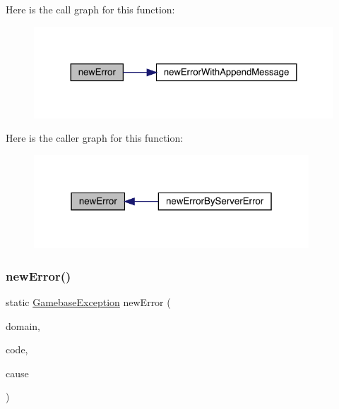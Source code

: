 Here is the call graph for this function\+:
\nopagebreak
\begin{figure}[H]
\begin{center}
\leavevmode
\includegraphics[width=324pt]{classcom_1_1toast_1_1android_1_1gamebase_1_1base_1_1_gamebase_error_a2d1d7646a1658d188ee9b65a25905661_cgraph}
\end{center}
\end{figure}
Here is the caller graph for this function\+:
\nopagebreak
\begin{figure}[H]
\begin{center}
\leavevmode
\includegraphics[width=292pt]{classcom_1_1toast_1_1android_1_1gamebase_1_1base_1_1_gamebase_error_a2d1d7646a1658d188ee9b65a25905661_icgraph}
\end{center}
\end{figure}
\mbox{\label{classcom_1_1toast_1_1android_1_1gamebase_1_1base_1_1_gamebase_error_a65b209f183118b929f313eedbadcfc71}} 
\subsubsection{\texorpdfstring{new\+Error()}{newError()}\hspace{0.1cm}{\footnotesize\ttfamily [2/2]}}
{\footnotesize\ttfamily static \hyperlink{classcom_1_1toast_1_1android_1_1gamebase_1_1base_1_1_gamebase_exception}{Gamebase\+Exception} new\+Error (\begin{DoxyParamCaption}\item[{@Non\+Null final String}]{domain,  }\item[{final int}]{code,  }\item[{@Nullable final Throwable}]{cause }\end{DoxyParamCaption})\hspace{0.3cm}{\ttfamily [static]}}

